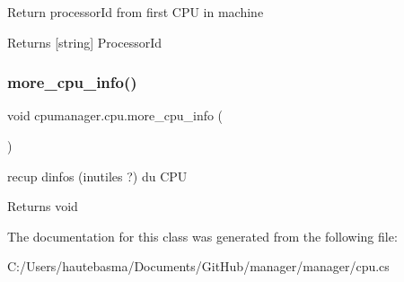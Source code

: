 Return processor\+Id from first C\+PU in machine 

\begin{DoxyReturn}{Returns}
\mbox{[}string\mbox{]} Processor\+Id
\end{DoxyReturn}
\mbox{\label{classcpumanager_1_1cpu_ad87f0af47000b1dbfe37fda42d287434}} 
\subsubsection{\texorpdfstring{more\+\_\+cpu\+\_\+info()}{more\_cpu\_info()}}
{\footnotesize\ttfamily void cpumanager.\+cpu.\+more\+\_\+cpu\+\_\+info (\begin{DoxyParamCaption}{ }\end{DoxyParamCaption})}



recup d\textquotesingle{}infos (inutiles ?) du C\+PU 

\begin{DoxyReturn}{Returns}
void
\end{DoxyReturn}


The documentation for this class was generated from the following file\+:\begin{DoxyCompactItemize}
\item 
C\+:/\+Users/hautebasma/\+Documents/\+Git\+Hub/manager/manager/cpu.\+cs\end{DoxyCompactItemize}
